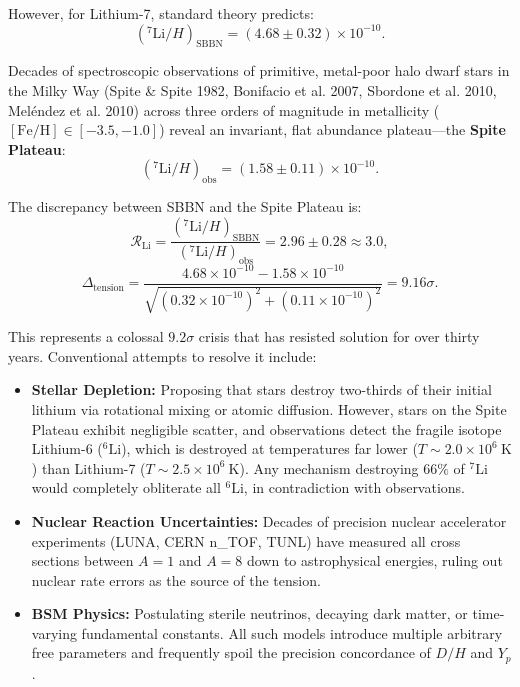 \documentclass[11pt, a4paper]{article}
\theoremstyle{definition}
\theoremstyle{remark}
\begin{document}
However, for Lithium-7, standard theory predicts:
\begin{equation}
  (^7\mathrm{Li}/H)_{\mathrm{SBBN}} = (4.68 \pm 0.32) \times 10^{-10}.
\end{equation}

Decades of spectroscopic observations of primitive, metal-poor halo dwarf stars in the Milky Way (Spite \& Spite 1982, Bonifacio et al. 2007, Sbordone et al. 2010, Meléndez et al. 2010) across three orders of magnitude in metallicity ($[\mathrm{Fe/H}] \in [-3.5, -1.0]$) reveal an invariant, flat abundance plateau---the \textbf{Spite Plateau}:
\begin{equation}
  (^7\mathrm{Li}/H)_{\mathrm{obs}} = (1.58 \pm 0.11) \times 10^{-10}.
\end{equation}

The discrepancy between SBBN and the Spite Plateau is:
\begin{equation}
  \mathcal{R}_{\mathrm{Li}} = \frac{(^7\mathrm{Li}/H)_{\mathrm{SBBN}}}{(^7\mathrm{Li}/H)_{\mathrm{obs}}} = 2.96 \pm 0.28 \approx 3.0,
\end{equation}
\begin{equation}
  \Delta_{\mathrm{tension}} = \frac{4.68 \times 10^{-10} - 1.58 \times 10^{-10}}{\sqrt{(0.32 \times 10^{-10})^2 + (0.11 \times 10^{-10})^2}} = 9.16\sigma.
\end{equation}

This represents a colossal $9.2\sigma$ crisis that has resisted solution for over thirty years. Conventional attempts to resolve it include:
\begin{itemize}
  \item \textbf{Stellar Depletion:} Proposing that stars destroy two-thirds of their initial lithium via rotational mixing or atomic diffusion. However, stars on the Spite Plateau exhibit negligible scatter, and observations detect the fragile isotope Lithium-6 ($^6\mathrm{Li}$), which is destroyed at temperatures far lower ($T \sim 2.0 \times 10^6~\mathrm{K}$) than Lithium-7 ($T \sim 2.5 \times 10^6~\mathrm{K}$). Any mechanism destroying $66\%$ of $^7\mathrm{Li}$ would completely obliterate all $^6\mathrm{Li}$, in contradiction with observations.
  \item \textbf{Nuclear Reaction Uncertainties:} Decades of precision nuclear accelerator experiments (LUNA, CERN n\_TOF, TUNL) have measured all cross sections between $A=1$ and $A=8$ down to astrophysical energies, ruling out nuclear rate errors as the source of the tension.
  \item \textbf{BSM Physics:} Postulating sterile neutrinos, decaying dark matter, or time-varying fundamental constants. All such models introduce multiple arbitrary free parameters and frequently spoil the precision concordance of $D/H$ and $Y_p$.
\end{itemize}
\end{document}
